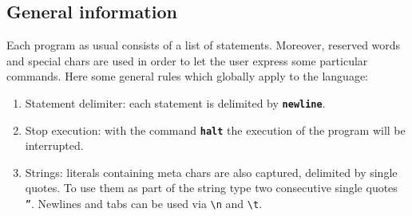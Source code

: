 \documentclass[12pt]{article}
\begin{document}
\subsection{General information}
Each program as usual consists of a list of statements. Moreover, reserved words and special chars are used in order to let the user express some particular commands. Here some general rules which globally apply to the language:
\begin{enumerate}
\item Statement delimiter: each statement is delimited by \texttt{\textbf{newline}}.
\item Stop execution: with the command \texttt{\textbf{halt}} the execution of the program will be interrupted.
\item Strings: literals containing meta chars are also captured, delimited by single quotes. To use them as part of the string type two consecutive single quotes \texttt{''}. Newlines and tabs can be used via \texttt{\textbackslash n} and \texttt{\textbackslash t}.
\end{enumerate}
\vspace{1cm}
\end{document}
